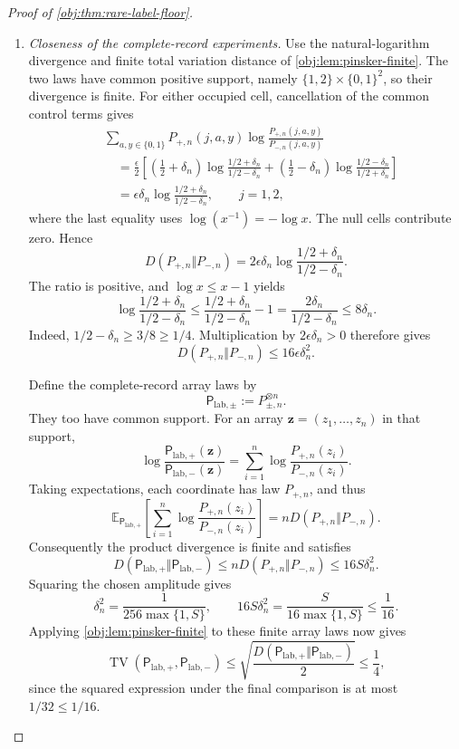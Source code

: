 \begin{proof}[Proof of \cref{obj:thm:rare-label-floor}]
\begin{enumerate}
\item \textit{Closeness of the complete-record experiments.}
Use the natural-logarithm divergence and finite total variation distance of
\cref{obj:lem:pinsker-finite}. The two laws have common positive support,
namely \(\{1,2\}\times\{0,1\}^2\), so their divergence is finite.
For either occupied cell, cancellation of the common control terms gives
\[
\begin{aligned}
&\sum_{a,y\in\{0,1\}}
P_{+,n}(j,a,y)
\log\frac{P_{+,n}(j,a,y)}{P_{-,n}(j,a,y)}\\
&\quad=
\frac{\epsilon}{2}\left[
\left(\frac12+\delta_n\right)
\log\frac{1/2+\delta_n}{1/2-\delta_n}
+
\left(\frac12-\delta_n\right)
\log\frac{1/2-\delta_n}{1/2+\delta_n}
\right]\\
&\quad=
\epsilon\delta_n
\log\frac{1/2+\delta_n}{1/2-\delta_n},
\qquad j=1,2,
\end{aligned}
\]
where the last equality uses \(\log(x^{-1})=-\log x\).
The null cells contribute zero. Hence
\[
D(P_{+,n}\Vert P_{-,n})
=
2\epsilon\delta_n
\log\frac{1/2+\delta_n}{1/2-\delta_n}.
\]
The ratio is positive, and \(\log x\le x-1\) yields
\[
\log\frac{1/2+\delta_n}{1/2-\delta_n}
\le
\frac{1/2+\delta_n}{1/2-\delta_n}-1
=
\frac{2\delta_n}{1/2-\delta_n}
\le8\delta_n.
\]
Indeed, \(1/2-\delta_n\ge3/8\ge1/4\). Multiplication by
\(2\epsilon\delta_n>0\) therefore gives
\[
D(P_{+,n}\Vert P_{-,n})
\le16\epsilon\delta_n^2.
\]

Define the complete-record array laws by
\[
\mathsf P_{\mathrm{lab},\pm}:=P_{\pm,n}^{\otimes n}.
\]
They too have common support. For an array
\(\boldsymbol z=(z_1,\ldots,z_n)\) in that support,
\[
\log
\frac{\mathsf P_{\mathrm{lab},+}(\boldsymbol z)}
     {\mathsf P_{\mathrm{lab},-}(\boldsymbol z)}
=
\sum_{i=1}^{n}
\log\frac{P_{+,n}(z_i)}{P_{-,n}(z_i)}.
\]
Taking expectations, each coordinate has law \(P_{+,n}\), and thus
\[
\mathbb E_{\mathsf P_{\mathrm{lab},+}}
\left[
\sum_{i=1}^{n}
\log\frac{P_{+,n}(z_i)}{P_{-,n}(z_i)}
\right]
=
nD(P_{+,n}\Vert P_{-,n}).
\]
Consequently the product divergence is finite and satisfies
\[
D(\mathsf P_{\mathrm{lab},+}\Vert\mathsf P_{\mathrm{lab},-})
\le
nD(P_{+,n}\Vert P_{-,n})
\le16S\delta_n^2.
\]
Squaring the chosen amplitude gives
\[
\delta_n^2
=
\frac1{256\max\{1,S\}},
\qquad
16S\delta_n^2
=
\frac{S}{16\max\{1,S\}}
\le\frac1{16}.
\]
Applying \cref{obj:lem:pinsker-finite} to these finite array laws now gives
\[
\operatorname{TV}
(\mathsf P_{\mathrm{lab},+},\mathsf P_{\mathrm{lab},-})
\le
\sqrt{
\frac{D(\mathsf P_{\mathrm{lab},+}\Vert
        \mathsf P_{\mathrm{lab},-})}{2}}
\le\frac14,
\]
since the squared expression under the final comparison is at most
\(1/32\le1/16\).


\end{enumerate}
\end{proof}
